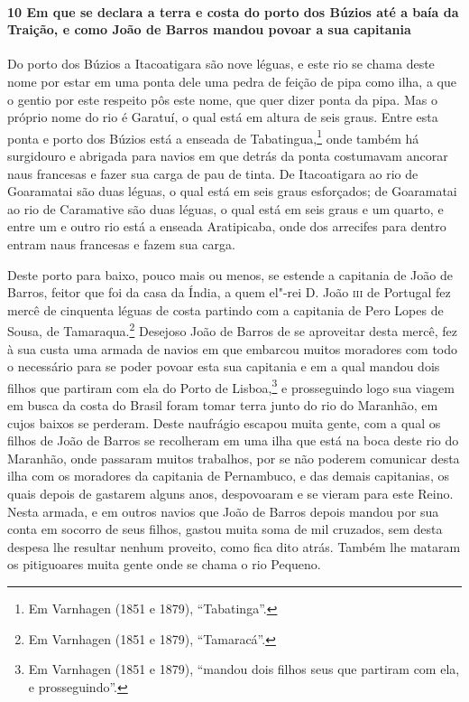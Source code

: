 \begin{linenumbers}
\paragraph{10 Em que se declara a terra e costa do porto dos Búzios até a baía da Traição,
e como João de Barros mandou povoar a sua capitania} \quad
Do porto dos Búzios a Itacoatigara são nove léguas, e este rio se chama deste nome por
estar em uma ponta dele uma pedra de feição de pipa como ilha, a que o gentio por este
respeito pôs este nome, que quer dizer ponta da pipa. Mas o próprio nome do rio é Garatuí,
o qual está em altura de seis graus. Entre esta ponta e porto dos Búzios está a enseada de
Tabatingua,\footnote{ Em Varnhagen (1851 e 1879), ``Tabatinga''.} onde também há
surgidouro e abrigada para navios em que detrás da ponta costumavam ancorar naus francesas
e fazer sua carga de pau de tinta. De Itacoatigara ao rio de Goaramatai são duas léguas, o
qual está em seis graus esforçados; de Goaramatai ao rio de Caramative são duas léguas, o
qual está em seis graus e um quarto, e entre um e outro rio está a enseada Aratipicaba,
onde dos arrecifes para dentro entram naus francesas e fazem sua carga.

Deste porto para baixo, pouco mais ou menos, se estende a capitania de João de Barros,
feitor que foi da casa da Índia, a quem el"-rei D. João \textsc{iii} de Portugal fez mercê
de cinquenta léguas de costa partindo com a capitania de Pero Lopes de Sousa, de
Tamaraqua.\footnote{ Em Varnhagen (1851 e 1879), ``Tamaracá''.} Desejoso João de Barros de
se aproveitar desta mercê, fez à sua custa uma armada de navios em que embarcou muitos
moradores com todo o necessário para se poder povoar esta sua capitania e em a qual mandou
dois filhos que partiram com ela do Porto de Lisboa,\footnote{ Em Varnhagen (1851 e 1879),
``mandou dois filhos seus que partiram com ela, e prosseguindo''.} e prosseguindo logo sua
viagem em busca da costa do Brasil foram tomar terra junto do rio do Maranhão, em cujos
baixos se perderam. Deste naufrágio escapou muita gente, com a qual os filhos de João de
Barros se recolheram em uma ilha que está na boca deste rio do Maranhão, onde passaram
muitos trabalhos, por se não poderem comunicar desta ilha com os moradores da capitania de
Pernambuco, e das demais capitanias, os quais depois de gastarem alguns anos, despovoaram
e se vieram para este Reino. Nesta armada, e em outros navios que João de Barros depois
mandou por sua conta em socorro de seus filhos, gastou muita soma de mil cruzados, sem
desta despesa lhe resultar nenhum proveito, como fica dito atrás. Também lhe mataram os
pitiguoares muita gente onde se chama o rio Pequeno.


\end{linenumbers}
